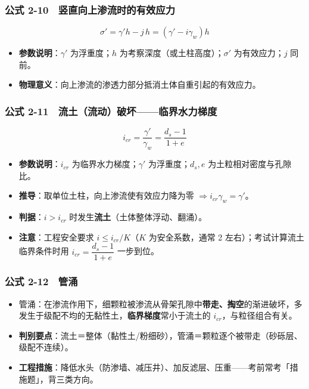 \documentclass[
]{article}
\providecommand{\tightlist}{%
  \setlength{\itemsep}{0pt}\setlength{\parskip}{0pt}}
\begin{document}
\subsubsection{公式
2-10　竖直向上渗流时的有效应力}\label{ux516cux5f0f-2-10-ux7ad6ux76f4ux5411ux4e0aux6e17ux6d41ux65f6ux7684ux6709ux6548ux5e94ux529b}

\[\sigma'=\gamma'h-j\,h=(\gamma'-i\gamma_w)h\]

\begin{itemize}
\tightlist
\item
  \textbf{参数说明}：\(\gamma'\) 为浮重度；\(h\)
  为考察深度（或土柱高度）；\(\sigma'\) 为有效应力；\(j\) 同前。
\item
  \textbf{物理意义}：向上渗流的渗透力部分抵消土体自重引起的有效应力。
\end{itemize}

\subsubsection{公式
2-11　流土（流动）破坏------临界水力梯度}\label{ux516cux5f0f-2-11-ux6d41ux571fux6d41ux52a8ux7834ux574fux4e34ux754cux6c34ux529bux68afux5ea6}

\[i_{cr}=\frac{\gamma'}{\gamma_w}=\frac{d_s-1}{1+e}\]

\begin{itemize}
\tightlist
\item
  \textbf{参数说明}：\(i_{cr}\) 为临界水力梯度；\(\gamma'\)
  为浮重度；\(d_s,e\) 为土粒相对密度与孔隙比。
\item
  \textbf{推导}：取单位土柱，向上渗流使有效应力降为零
  \(\Rightarrow i_{cr}\gamma_w=\gamma'\)。
\item
  \textbf{判据}：\(i>i_{cr}\)
  时发生\textbf{流土}（土体整体浮动、翻涌）。
\item
  \textbf{注意}：工程安全要求 \(i\le i_{cr}/K\)（\(K\) 为安全系数，通常
  2 左右）；考试计算流土临界条件时用 \(i_{cr}=\dfrac{d_s-1}{1+e}\)
  一步到位。
\end{itemize}

\subsubsection{公式 2-12　管涌}\label{ux516cux5f0f-2-12-ux7ba1ux6d8c}

\begin{itemize}
\tightlist
\item
  管涌：在渗流作用下，细颗粒被渗流从骨架孔隙中\textbf{带走、掏空}的渐进破坏，多发生于级配不均的无黏性土，\textbf{临界梯度}常小于流土的
  \(i_{cr}\)，与粒径组合有关。
\item
  \textbf{判别要点}：流土＝整体（黏性土/粉细砂），管涌＝颗粒逐个被带走（砂砾层、级配不连续）。
\item
  \textbf{工程措施}：降低水头（防渗墙、减压井）、加反滤层、压重------考前常考「措施题」，背三类方向。
\end{itemize}
\end{document}
